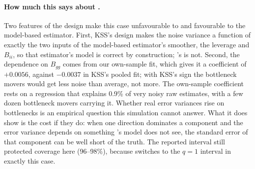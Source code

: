 \paragraph{How much this says about \fevc.} Two features of the design make this case unfavourable to \fevc{} and
favourable to the model-based estimator. First, KSS's design makes the noise variance a function of exactly the
two inputs of the model-based estimator's smoother, the leverage and $B_{ii}$, so that estimator's model is
correct by construction; \fevc's is not. Second, the dependence on $B_{gg}$ comes from our own-sample fit, which
gives it a coefficient of $+0.0056$, against $-0.0037$ in KSS's pooled fit; with KSS's sign the bottleneck movers
would get less noise than average, not more. The own-sample coefficient rests on a regression that explains
0.9\% of very noisy raw estimates, with a few dozen bottleneck movers carrying it. Whether real error variances
rise on bottlenecks is an empirical question this simulation cannot answer. What it does show is the cost if they
do: when one direction dominates a component and the error variance depends on something \fevc's model does not
see, the standard error of that component can be well short of the truth. The reported interval still protected
coverage here (96--98\%), because \fevc{} switches to the $q=1$ interval in exactly this case.
